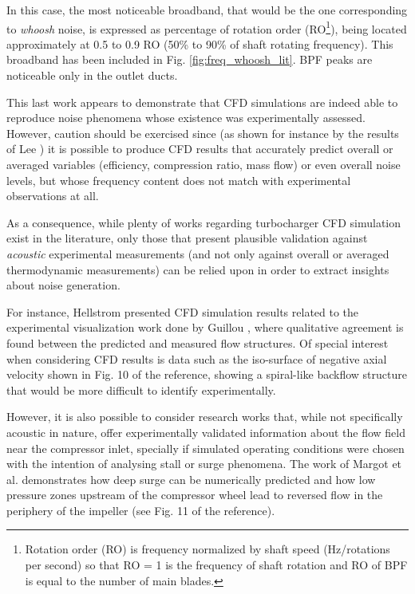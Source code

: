 In this case, the most noticeable broadband, that would be the one corresponding to \emph{whoosh} noise, is expressed as percentage of rotation order (RO\footnote{Rotation order (RO) is frequency normalized by shaft speed (Hz/rotations per second) so that RO = 1 is the frequency of shaft rotation and RO of BPF is equal to the number of main blades.}), being located approximately at 0.5 to 0.9 RO (50\% to 90\% of shaft rotating frequency). This broadband has been included in Fig. \ref{fig:freq_whoosh_lit}. BPF peaks are noticeable only in the outlet ducts. 

This last work appears to demonstrate that CFD simulations are indeed able to reproduce noise phenomena whose existence was experimentally assessed. However, caution should be exercised since (as shown for instance by the results of Lee \cite{lee2011control}) it is possible to produce CFD results that accurately predict overall or averaged variables (efficiency, compression ratio, mass flow) or even overall noise levels, but whose frequency content does not match with experimental observations at all.

As a consequence, while plenty of works regarding turbocharger CFD simulation exist in the literature, only those that present plausible validation against \emph{acoustic} experimental measurements (and not only against overall or averaged thermodynamic measurements) can be relied upon in order to extract insights about noise generation.

For instance, Hellstrom \cite{hellstrom2010stall} presented CFD simulation results related to the experimental visualization work done by Guillou \cite{guillou2011flow}, where qualitative agreement is found between the predicted and measured flow structures. Of special interest when considering CFD results is data such as the iso-surface of negative axial velocity shown in Fig. 10 of the reference, showing a spiral-like backflow structure that would be more difficult to identify experimentally.

However, it is also possible to consider research works that, while not specifically acoustic in nature, offer experimentally validated information about the flow field near the compressor inlet, specially if simulated operating conditions were chosen with the intention of analysing stall or surge phenomena. The work of Margot et al. \cite{margot2008combination} demonstrates how deep surge can be numerically predicted and how low pressure zones upstream of the compressor wheel lead to reversed flow in the periphery of the impeller (see Fig. 11 of the reference).


